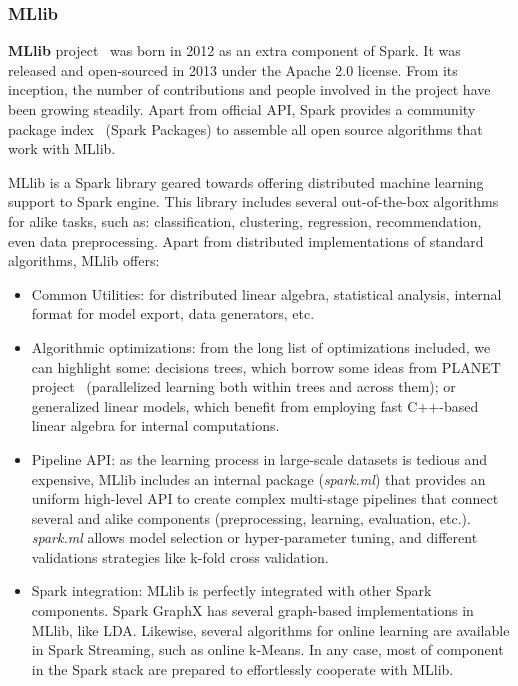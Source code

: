 \documentclass[3p,review]{elsarticle}
\begin{document}
	\subsubsection{MLlib}
	
	\textbf{MLlib} project~\cite{mllib15} was born in 2012 as an extra component of Spark. It was released and open-sourced in 2013 under the Apache 2.0 license. From its inception, the number of contributions and people involved in the project have been growing steadily. Apart from official API, Spark provides a community package index~\cite{sparkpackages} (Spark Packages) to assemble all open source algorithms that work with MLlib. 
	
	MLlib is a Spark library geared towards offering distributed machine learning support to Spark engine. This library includes several out-of-the-box algorithms for alike tasks, such as: classification, clustering, regression, recommendation, even data preprocessing. Apart from distributed implementations of standard algorithms, MLlib offers:
	
	\begin{itemize}
		\item Common Utilities: for distributed linear algebra, statistical analysis, internal format for model export, data generators, etc. 
		\item Algorithmic optimizations: from the long list of optimizations included, we can highlight some: decisions trees, which borrow some ideas from PLANET project~\cite{panda09} (parallelized learning both within trees and across them); or generalized linear models, which benefit from employing fast C++-based linear algebra for internal computations.
		\item Pipeline API: as the learning process in large-scale datasets is tedious and expensive, MLlib includes an internal package (\emph{spark.ml}) that provides an uniform high-level API to create complex multi-stage pipelines that connect several and alike components (preprocessing, learning, evaluation, etc.). \emph{spark.ml} allows model selection or hyper-parameter tuning, and different validations strategies like k-fold cross validation.
		\item Spark integration: MLlib is perfectly integrated with other Spark components. Spark GraphX has several graph-based implementations in MLlib, like LDA. Likewise, several algorithms for online learning are available in Spark Streaming, such as online k-Means. In any case, most of component in the Spark stack are prepared to effortlessly cooperate with MLlib.
	\end{itemize}
	
\end{document}
